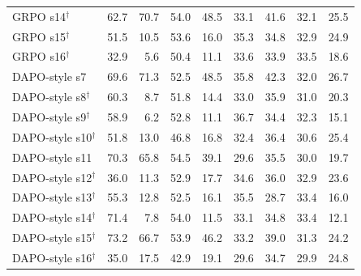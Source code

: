 \documentclass[11pt]{article}
\begin{document}
\begin{table}[p]
{\begin{tabular}{lrrrrrrrr}
GRPO s14$^\dagger$ & 62.7 & 70.7 & 54.0 & 48.5 & 33.1 & 41.6 & 32.1 & 25.5 \\
GRPO s15$^\dagger$ & 51.5 & 10.5 & 53.6 & 16.0 & 35.3 & 34.8 & 32.9 & 24.9 \\
GRPO s16$^\dagger$ & 32.9 & 5.6 & 50.4 & 11.1 & 33.6 & 33.9 & 33.5 & 18.6 \\
\midrule
DAPO-style s7 & 69.6 & 71.3 & 52.5 & 48.5 & 35.8 & 42.3 & 32.0 & 26.7 \\
DAPO-style s8$^\dagger$ & 60.3 & 8.7 & 51.8 & 14.4 & 33.0 & 35.9 & 31.0 & 20.3 \\
DAPO-style s9$^\dagger$ & 58.9 & 6.2 & 52.8 & 11.1 & 36.7 & 34.4 & 32.3 & 15.1 \\
DAPO-style s10$^\dagger$ & 51.8 & 13.0 & 46.8 & 16.8 & 32.4 & 36.4 & 30.6 & 25.4 \\
DAPO-style s11 & 70.3 & 65.8 & 54.5 & 39.1 & 29.6 & 35.5 & 30.0 & 19.7 \\
DAPO-style s12$^\dagger$ & 36.0 & 11.3 & 52.9 & 17.7 & 34.6 & 36.0 & 32.9 & 23.6 \\
DAPO-style s13$^\dagger$ & 55.3 & 12.8 & 52.5 & 16.1 & 35.5 & 28.7 & 33.4 & 16.0 \\
DAPO-style s14$^\dagger$ & 71.4 & 7.8 & 54.0 & 11.5 & 33.1 & 34.8 & 33.4 & 12.1 \\
DAPO-style s15$^\dagger$ & 73.2 & 66.7 & 53.9 & 46.2 & 33.2 & 39.0 & 31.3 & 24.2 \\
DAPO-style s16$^\dagger$ & 35.0 & 17.5 & 42.9 & 19.1 & 29.6 & 34.7 & 29.9 & 24.8 \\
\bottomrule
\end{tabular}}
\end{table}
\end{document}
